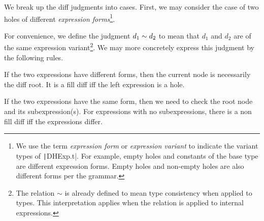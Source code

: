 We break up the diff judgments into cases. First, we may consider the case of two holes of different \textit{expression forms}\footnote{We use the term \textit{expression form} or \textit{expression variant} to indicate the variant types of \texttt|DHExp.t|. For example, empty holes and constants of the base type are different expression forms. Empty holes and non-empty holes are also different forms per the grammar.}.

For convenience, we define the judgment $d_1\sim d_2$ to mean that $d_1$ and $d_2$ are of the same expression variant\footnote{The relation $\sim$ is already defined to mean type consistency when applied to types. This interpretation applies when the relation is applied to internal expressions.}. We may more concretely express this judgment by the following rules.

\begin{singlespace}
\end{singlespace}

If the two expressions have different forms, then the current node is necessarily the diff root. It is a fill diff iff the left expression is a hole.

\begin{singlespace}
\end{singlespace}

If the two expressions have the same form, then we need to check the root node and its subexpression(s). For expressions with no subexpressions, there is a non fill diff iff the expressions differ.

